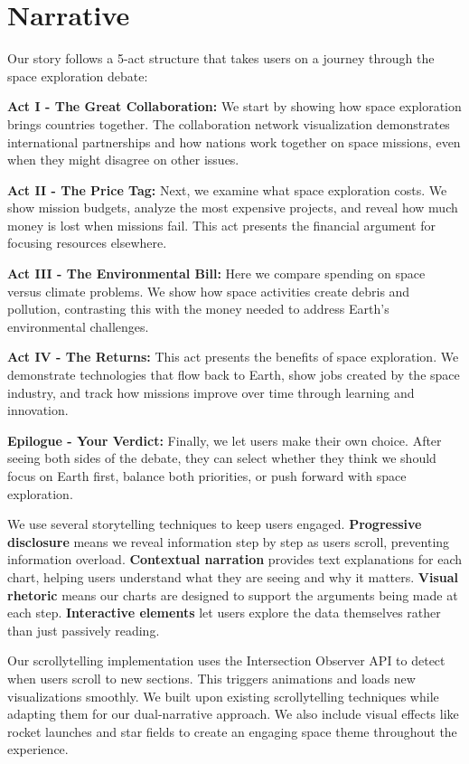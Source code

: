 \documentclass[sigconf]{acmart}
\begin{document}
\section{Narrative}

Our story follows a 5-act structure that takes users on a journey through the space exploration debate:

\textbf{Act I - The Great Collaboration:} We start by showing how space exploration brings countries together. The collaboration network visualization demonstrates international partnerships and how nations work together on space missions, even when they might disagree on other issues.

\textbf{Act II - The Price Tag:} Next, we examine what space exploration costs. We show mission budgets, analyze the most expensive projects, and reveal how much money is lost when missions fail. This act presents the financial argument for focusing resources elsewhere.

\textbf{Act III - The Environmental Bill:} Here we compare spending on space versus climate problems. We show how space activities create debris and pollution, contrasting this with the money needed to address Earth's environmental challenges.

\textbf{Act IV - The Returns:} This act presents the benefits of space exploration. We demonstrate technologies that flow back to Earth, show jobs created by the space industry, and track how missions improve over time through learning and innovation.

\textbf{Epilogue - Your Verdict:} Finally, we let users make their own choice. After seeing both sides of the debate, they can select whether they think we should focus on Earth first, balance both priorities, or push forward with space exploration.

We use several storytelling techniques to keep users engaged. \textbf{Progressive disclosure} means we reveal information step by step as users scroll, preventing information overload. \textbf{Contextual narration} provides text explanations for each chart, helping users understand what they are seeing and why it matters. \textbf{Visual rhetoric} means our charts are designed to support the arguments being made at each step. \textbf{Interactive elements} let users explore the data themselves rather than just passively reading.

Our scrollytelling implementation uses the Intersection Observer API \cite{IntersectionObserver} to detect when users scroll to new sections. This triggers animations and loads new visualizations smoothly. We built upon existing scrollytelling techniques \cite{PuddingScrollytelling} while adapting them for our dual-narrative approach. We also include visual effects like rocket launches and star fields to create an engaging space theme throughout the experience.
\end{document}
